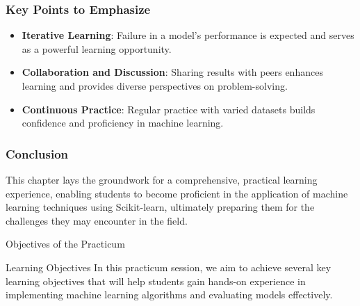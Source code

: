 \documentclass[aspectratio=169]{beamer}
\begin{document}
\begin{frame}[fragile]
    \frametitle{Key Points to Emphasize}
    \begin{itemize}
        \item \textbf{Iterative Learning}: Failure in a model's performance is expected and serves as a powerful learning opportunity.
        
        \item \textbf{Collaboration and Discussion}: Sharing results with peers enhances learning and provides diverse perspectives on problem-solving.
        
        \item \textbf{Continuous Practice}: Regular practice with varied datasets builds confidence and proficiency in machine learning.
    \end{itemize}
\end{frame}

\begin{frame}[fragile]
    \frametitle{Conclusion}
    This chapter lays the groundwork for a comprehensive, practical learning experience, enabling students to become proficient in the application of machine learning techniques using Scikit-learn, ultimately preparing them for the challenges they may encounter in the field.
\end{frame}

\begin{frame}[fragile]{Objectives of the Practicum}
    \begin{block}{Learning Objectives}
        In this practicum session, we aim to achieve several key learning objectives that will help students gain hands-on experience in implementing machine learning algorithms and evaluating models effectively.
    \end{block}
\end{frame}
\end{document}
